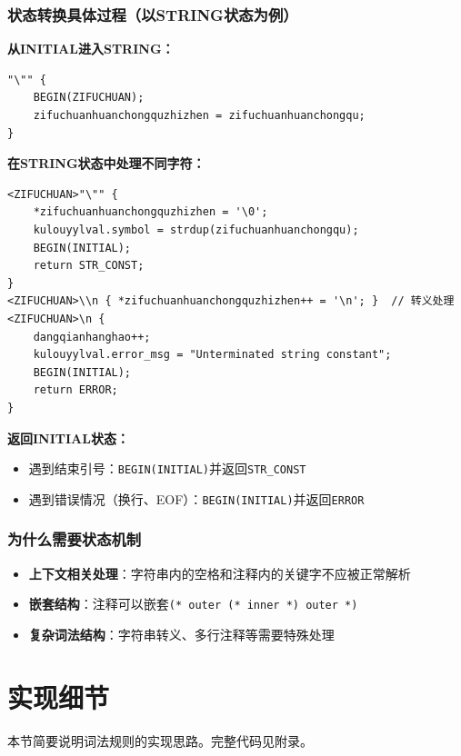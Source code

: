 \documentclass[twocolumn]{article}
\begin{document}
\subsubsection{状态转换具体过程（以STRING状态为例）}

\textbf{从INITIAL进入STRING：}
\begin{lstlisting}[language=Flex, caption={进入STRING状态}]
"\"" { 
    BEGIN(ZIFUCHUAN); 
    zifuchuanhuanchongquzhizhen = zifuchuanhuanchongqu; 
}
\end{lstlisting}

\textbf{在STRING状态中处理不同字符：}
\begin{lstlisting}[language=Flex, caption={STRING状态中的字符处理}]
<ZIFUCHUAN>"\"" { 
    *zifuchuanhuanchongquzhizhen = '\0';
    kulouyylval.symbol = strdup(zifuchuanhuanchongqu);
    BEGIN(INITIAL);
    return STR_CONST;
}
<ZIFUCHUAN>\\n { *zifuchuanhuanchongquzhizhen++ = '\n'; }  // 转义处理
<ZIFUCHUAN>\n { 
    dangqianhanghao++; 
    kulouyylval.error_msg = "Unterminated string constant";
    BEGIN(INITIAL);
    return ERROR;
}
\end{lstlisting}

\textbf{返回INITIAL状态：}
\begin{itemize}
    \item 遇到结束引号：\texttt{BEGIN(INITIAL)}并返回\texttt{STR\_CONST}
    \item 遇到错误情况（换行、EOF）：\texttt{BEGIN(INITIAL)}并返回\texttt{ERROR}
\end{itemize}

\subsubsection{为什么需要状态机制}
\begin{itemize}
    \item \textbf{上下文相关处理}：字符串内的空格和注释内的关键字不应被正常解析
    \item \textbf{嵌套结构}：注释可以嵌套\texttt{(* outer (* inner *) outer *)}
    \item \textbf{复杂词法结构}：字符串转义、多行注释等需要特殊处理
\end{itemize}


\section{实现细节}
本节简要说明词法规则的实现思路。完整代码见附录。
\end{document}
